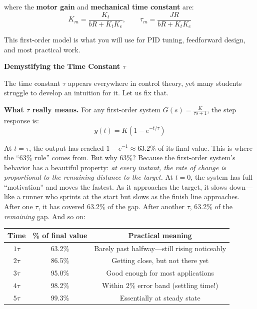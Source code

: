 where the \textbf{motor gain} and \textbf{mechanical time constant} are:
\begin{equation}
K_m = \frac{K_t}{bR + K_t K_e}, \qquad \tau_m = \frac{JR}{bR + K_t K_e}
\end{equation}

This first-order model is what you will use for PID tuning, feedforward design, and most practical work.

\vspace{0.5em}
\begin{mdframed}[linewidth=1pt, innertopmargin=10pt, innerbottommargin=10pt]
\textbf{Demystifying the Time Constant $\tau$}

\vspace{0.3em}
The time constant $\tau$ appears everywhere in control theory, yet many students struggle to develop an intuition for it. Let us fix that.

\textbf{What $\tau$ really means.} For any first-order system $G(s) = \frac{K}{\tau s + 1}$, the step response is:
\[
y(t) = K\left(1 - e^{-t/\tau}\right)
\]

At $t = \tau$, the output has reached $1 - e^{-1} \approx 63.2\%$ of its final value. This is where the ``63\% rule'' comes from. But why 63\%? Because the first-order system's behavior has a beautiful property: \textit{at every instant, the rate of change is proportional to the remaining distance to the target.} At $t = 0$, the system has full ``motivation'' and moves the fastest. As it approaches the target, it slows down---like a runner who sprints at the start but slows as the finish line approaches. After one $\tau$, it has covered 63.2\% of the gap. After another $\tau$, 63.2\% of the \textit{remaining} gap. And so on:

\begin{center}
\begin{tabular}{ccc}
\toprule
\textbf{Time} & \textbf{\% of final value} & \textbf{Practical meaning} \\
\midrule
$1\tau$ & 63.2\% & Barely past halfway---still rising noticeably \\
$2\tau$ & 86.5\% & Getting close, but not there yet \\
$3\tau$ & 95.0\% & Good enough for most applications \\
$4\tau$ & 98.2\% & Within 2\% error band (settling time!) \\
$5\tau$ & 99.3\% & Essentially at steady state \\
\bottomrule
\end{tabular}
\end{center}


\end{mdframed}
